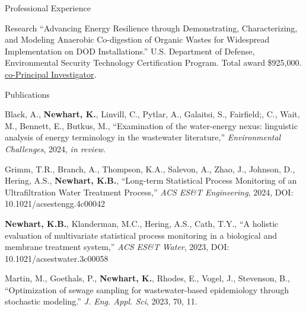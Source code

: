\documentclass{resume} %
\begin{document}
\begin{rSection}{Professional Experience}
\begin{rSection}{Research}
``Advancing Energy Resilience through Demonstrating, Characterizing, and Modeling Anaerobic Co-digestion of Organic Wastes for Widespread Implementation on DOD Installations.''  U.S. Department of Defense, Environmental Security Technology Certification Program. Total award \$925,000. \ul{co-Principal Investigator}.

\end{rSection}

\newpage


\begin{rSection}{Publications}
\begin{etaremune}

	\item Black, A.,  \textbf{Newhart, K.},  Linvill, C.,  Pytlar, A., Galaitsi, S.,  Fairfield;, C.,  Wait, M.,  Bennett, E.,  Butkus, M., ``Examination of the water-energy nexus: linguistic analysis of energy terminology in the wastewater literature,'' \emph{Environmental Challenges}, 2024, \emph{in review}.

	\item Grimm, T.R., Branch, A., Thompson, K.A., Salevon, A., Zhao, J., Johnson, D., Hering, A.S., \textbf{Newhart, K.B.}, ``Long-term Statistical Process Monitoring of an Ultrafiltration Water Treatment Process,'' \emph{ACS ES\&T Engineering}, 2024, DOI: 10.1021/acsestengg.4c00042


	\item \textbf{Newhart, K.B.}, Klanderman, M.C., Hering, A.S., Cath, T.Y., ``A holistic evaluation of multivariate statistical process monitoring in a biological and membrane treatment system,'' \emph{ACS ES\&T Water}, 2023, DOI: 10.1021/acsestwater.3c00058

	\item Martin, M., Goethals, P., \textbf{Newhart, K.}, Rhodes, E., Vogel, J., Stevenson, B., ``Optimization of sewage sampling for wastewater-based epidemiology through stochastic modeling.'' \emph{J. Eng. Appl. Sci}, 2023, 70, 11.


\end{etaremune}
\end{rSection}
\end{rSection}
\end{document}
